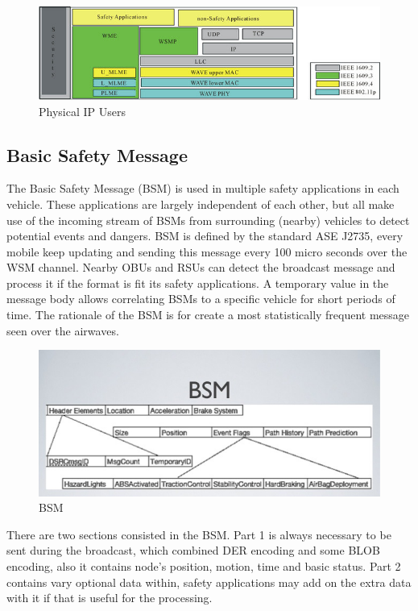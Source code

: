 \documentclass[conference]{IEEEtran}
\begin{document}
\begin{figure}[h]
  \includegraphics[width=\linewidth]{DSRC_Standard.jpg}
  \caption{Physical IP Users}
  \label{fig:User}
\end{figure}

\subsection{Basic Safety Message}
The Basic Safety Message (BSM) is used in multiple safety applications in each vehicle. These applications are largely independent of each other, but all make use of the incoming stream of BSMs from surrounding (nearby) vehicles to detect potential events and dangers\cite{BSM}. BSM is defined by the standard ASE J2735, every mobile keep updating and sending this message every 100 micro seconds over the WSM channel. Nearby OBUs and RSUs can detect the broadcast message and process it if the format is fit its safety applications. A temporary value in the message body allows correlating BSMs to a specific vehicle for short periods of time. The rationale of the BSM is for create a most statistically frequent message seen over the airwaves.
\begin{figure}[h]
  \includegraphics[width=\linewidth]{BSM.jpg}
  \caption{BSM}
  \label{fig:BSM}
\end{figure}

There are two sections consisted in the BSM. Part 1 is always necessary to be sent during the broadcast, which combined DER encoding and some BLOB encoding, also it contains node's position, motion, time and basic status. Part 2 contains vary optional data within, safety applications may add on the extra data with it if that is useful for the processing.\cite{BSM}
\end{document}
